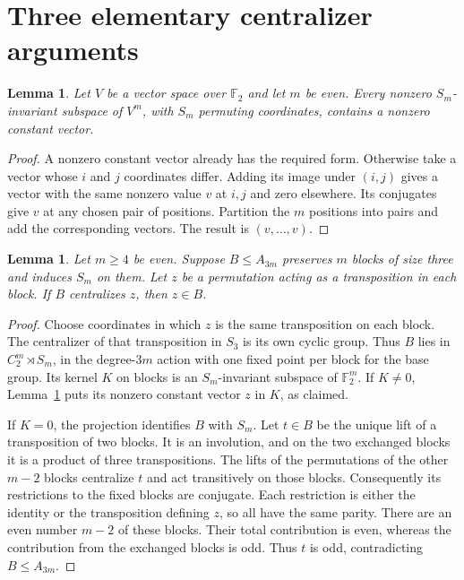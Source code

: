 \documentclass[11pt,a4paper]{article}
\newtheorem{lemma}[theorem]{Lemma}
\begin{document}
\section{Three elementary centralizer arguments}
\begin{lemma}\label{constants}
Let $V$ be a vector space over $\mathbb F_2$ and let $m$ be even.
Every nonzero $S_m$-invariant subspace of $V^m$, with $S_m$ permuting
coordinates, contains a nonzero constant vector.
\end{lemma}
\begin{proof}
A nonzero constant vector already has the required form. Otherwise take
a vector whose $i$ and $j$ coordinates differ. Adding its image under
$(i,j)$ gives a vector with the same nonzero value $v$ at $i,j$ and zero
elsewhere. Its conjugates give $v$ at any chosen pair of positions.
Partition the $m$ positions into pairs and add the corresponding vectors.
The result is $(v,\ldots,v)$.
\end{proof}

\begin{lemma}\label{three}
Let $m\ge4$ be even. Suppose $B\le A_{3m}$ preserves $m$ blocks of
size three and induces $S_m$ on them. Let $z$ be a permutation acting
as a transposition in each block. If $B$ centralizes $z$, then $z\in B$.
\end{lemma}
\begin{proof}
Choose coordinates in which $z$ is the same transposition on each block.
The centralizer of that transposition in $S_3$ is its own cyclic group.
Thus $B$ lies in $C_2^m\rtimes S_m$, in the degree-$3m$ action with one
fixed point per block for the base group. Its kernel $K$ on blocks is an
$S_m$-invariant subspace of $\mathbb F_2^m$. If $K\ne0$, Lemma~\ref{constants}
puts its nonzero constant vector $z$ in $K$, as claimed.

If $K=0$, the projection identifies $B$ with $S_m$. Let $t\in B$ be
the unique lift of a transposition of two blocks. It is an involution,
and on the two exchanged blocks it is a product of three transpositions.
The lifts of the permutations of the other $m-2$ blocks centralize $t$
and act transitively on those blocks. Consequently its restrictions to
the fixed blocks are conjugate. Each restriction is either the identity
or the transposition defining $z$, so all have the same parity. There
are an even number $m-2$ of these blocks. Their total contribution is
even, whereas the contribution from the exchanged blocks is odd.
Thus $t$ is odd, contradicting $B\le A_{3m}$.
\end{proof}
\end{document}
